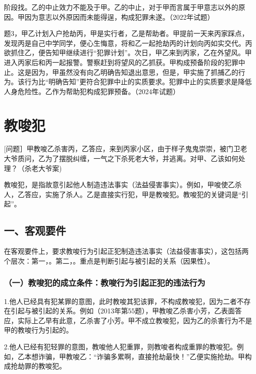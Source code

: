 阶段找。乙的中止效力不能及于甲。乙的中止，对于甲而言属于甲意志以外的原因。甲因为意志以外原因而未能得逞，构成犯罪未遂。（2022年试题）

题3，甲乙计划入户抢劫丙，甲是实行者，乙是帮助者。甲提前一天来丙家踩点，发现丙是自己中学同学，便心生悔意，将和乙一起抢劫丙的计划向丙如实交代。丙欲抓住乙，便告知甲继续进行“犯罪计划”。次日，甲乙来到丙家，乙在外望风。甲进入丙家后和丙一起报警。警察赶到将望风的乙抓获。甲构成预备阶段的犯罪中止。这是因为，甲虽然没有向乙明确告知退出意思，但是，甲实施了抓捕乙的行为。该行为比“明确告知”更符合犯罪中止的实质要求。犯罪中止的实质要求是降低人身危险性。乙作为帮助犯构成犯罪预备。（2024年试题）

\section{教唆犯}

[问题］甲教唆乙杀害丙，乙答应，来到丙家小区，由于样子鬼鬼崇崇，被门卫老大爷质问，乙为了摆脱纠缠，一气之下杀死老大爷，并逃离。对甲、乙该如何处理？（杀老大爷案)

教唆犯，是指故意引起他人制造违法事实（法益侵害事实）。例如，甲唆使乙杀人，乙答应，实施了杀人。乙是直接实行犯，甲是教唆犯。教唆犯的关键词是“引起”。


\subsection*{一、客观要件}

在客观要件上，要求教唆行为引起正犯制造违法事实（法益侵害事实），这包括两个层次：第一，。第二，。重点是判断引起与被引起的关系（因果性）。

\subsubsection*{（一）教唆犯的成立条件：教唆行为引起正犯的违法行为}

1.他人已经具有犯某罪的意图，此时教唆其犯该罪，不构成教唆犯，因为二者不存在引起与被引起的关系。例如（2013年第55题），甲教唆乙杀害小芳，乙表面答应，实际上乙早有此意，乙杀害了小芳。甲不成立教唆犯，因为乙的杀害行为不是甲的教唆行为引起的。

2.他人已经有犯轻罪的意图，教唆他人犯重罪，则教唆者构成重罪的教唆犯。例如，乙本想诈骗，甲教唆乙：“诈骗多累啊，直接抢劫最快！”乙便实施抢劫。甲构成抢劫罪的教唆犯。

